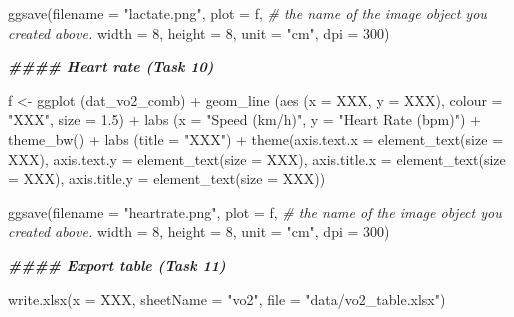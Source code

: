 \documentclass[
]{book}
\newenvironment{Shaded}{\begin{snugshade}}{\end{snugshade}}
\newcommand{\AttributeTok}[1]{\textcolor[rgb]{0.77,0.63,0.00}{#1}}
\newcommand{\CommentTok}[1]{\textcolor[rgb]{0.56,0.35,0.01}{\textit{#1}}}
\newcommand{\DecValTok}[1]{\textcolor[rgb]{0.00,0.00,0.81}{#1}}
\newcommand{\DocumentationTok}[1]{\textcolor[rgb]{0.56,0.35,0.01}{\textbf{\textit{#1}}}}
\newcommand{\FloatTok}[1]{\textcolor[rgb]{0.00,0.00,0.81}{#1}}
\newcommand{\FunctionTok}[1]{\textcolor[rgb]{0.00,0.00,0.00}{#1}}
\newcommand{\NormalTok}[1]{#1}
\newcommand{\OtherTok}[1]{\textcolor[rgb]{0.56,0.35,0.01}{#1}}
\newcommand{\SpecialCharTok}[1]{\textcolor[rgb]{0.00,0.00,0.00}{#1}}
\newcommand{\StringTok}[1]{\textcolor[rgb]{0.31,0.60,0.02}{#1}}
\begin{document}
\begin{Shaded}
\begin{Highlighting}[]
\FunctionTok{ggsave}\NormalTok{(}\AttributeTok{filename =} \StringTok{"lactate.png"}\NormalTok{, }
       \AttributeTok{plot =}\NormalTok{ f, }\CommentTok{\# the name of the image object you created above.}
       \AttributeTok{width =} \DecValTok{8}\NormalTok{, }
       \AttributeTok{height =} \DecValTok{8}\NormalTok{, }
       \AttributeTok{unit =} \StringTok{"cm"}\NormalTok{, }
       \AttributeTok{dpi =} \DecValTok{300}\NormalTok{)}

\DocumentationTok{\#\#\#\# Heart rate (Task 10)}

\NormalTok{f }\OtherTok{\textless{}{-}} \FunctionTok{ggplot}\NormalTok{ (dat\_vo2\_comb) }\SpecialCharTok{+}
  \FunctionTok{geom\_line}\NormalTok{ (}\FunctionTok{aes}\NormalTok{ (}\AttributeTok{x =}\NormalTok{ XXX, }\AttributeTok{y =}\NormalTok{ XXX), }\AttributeTok{colour =} \StringTok{"XXX"}\NormalTok{, }\AttributeTok{size =} \FloatTok{1.5}\NormalTok{) }\SpecialCharTok{+} 
  \FunctionTok{labs}\NormalTok{ (}\AttributeTok{x =} \StringTok{"Speed (km/h)"}\NormalTok{,}
        \AttributeTok{y =} \StringTok{"Heart Rate (bpm)"}\NormalTok{) }\SpecialCharTok{+}
  \FunctionTok{theme\_bw}\NormalTok{() }\SpecialCharTok{+} 
  \FunctionTok{labs}\NormalTok{ (}\AttributeTok{title =} \StringTok{"XXX"}\NormalTok{) }\SpecialCharTok{+} 
  \FunctionTok{theme}\NormalTok{(}\AttributeTok{axis.text.x =} \FunctionTok{element\_text}\NormalTok{(}\AttributeTok{size =}\NormalTok{ XXX),}
        \AttributeTok{axis.text.y =} \FunctionTok{element\_text}\NormalTok{(}\AttributeTok{size =}\NormalTok{ XXX),  }
        \AttributeTok{axis.title.x =} \FunctionTok{element\_text}\NormalTok{(}\AttributeTok{size =}\NormalTok{ XXX),}
        \AttributeTok{axis.title.y =} \FunctionTok{element\_text}\NormalTok{(}\AttributeTok{size =}\NormalTok{ XXX))}

\FunctionTok{ggsave}\NormalTok{(}\AttributeTok{filename =} \StringTok{"heartrate.png"}\NormalTok{, }
       \AttributeTok{plot =}\NormalTok{ f, }\CommentTok{\# the name of the image object you created above.}
       \AttributeTok{width =} \DecValTok{8}\NormalTok{, }
       \AttributeTok{height =} \DecValTok{8}\NormalTok{, }
       \AttributeTok{unit =} \StringTok{"cm"}\NormalTok{, }
       \AttributeTok{dpi =} \DecValTok{300}\NormalTok{)}

\DocumentationTok{\#\#\#\# Export table (Task 11)}

\FunctionTok{write.xlsx}\NormalTok{(}\AttributeTok{x =}\NormalTok{ XXX,}
           \AttributeTok{sheetName =} \StringTok{"vo2"}\NormalTok{,}
           \AttributeTok{file =} \StringTok{"data/vo2\_table.xlsx"}\NormalTok{)}


\end{Highlighting}
\end{Shaded}
\end{document}

